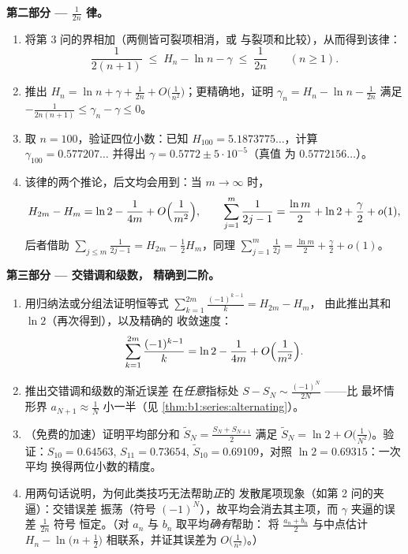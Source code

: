 \begin{problem}[{周末问题 --- $H_n = \ln n + \gamma +
\frac{1}{2n} + O(n^{-2})$，并将 $1 - \frac12 +
\frac13 - \dots$ 重排为 $\frac{\ln 2}{2}$}]
\medskip
\noindent\textbf{第二部分 --- $\frac{1}{2n}$ 律。}
\begin{enumerate}[resume]
  \item 将第 3 问的界相加（两侧皆可裂项相消，或
        与裂项和比较），从而得到该律：
        \[
        \frac{1}{2(n+1)} \;\leq\; H_n - \ln n - \gamma \;\leq\;
        \frac{1}{2n} \qquad (n \geq 1).
        \]
  \item 推出 $H_n = \ln n + \gamma + \frac{1}{2n} +
        O\bigl(\frac{1}{n^2}\bigr)$；更精确地，证明
        $\gamma_n = H_n - \ln n - \frac{1}{2n}$ 满足
        $-\frac{1}{2n(n+1)} \leq \gamma_n - \gamma \leq 0$。
  \item 取 $n = 100$，验证四位小数：已知 $H_{100} =
        5.1873775\dots$，计算 $\gamma_{100} = 0.577207\dots$
        并得出 $\gamma = 0.5772 \pm 5\cdot10^{-5}$（真值
        为 $0.5772156\dots$）。
  \item 该律的两个推论，后文均会用到：当 $m \to
        \infty$ 时，
        \[
        H_{2m} - H_m = \ln 2 - \frac{1}{4m} +
        O\Bigl(\frac{1}{m^2}\Bigr),
        \qquad
        \sum_{j=1}^{m} \frac{1}{2j-1} = \frac{\ln m}{2} + \ln 2
        + \frac\gamma2 + o(1) ,
        \]
        后者借助 $\sum_{j \leq m} \frac{1}{2j-1} = H_{2m}
        - \frac12 H_m$，同理 $\sum_{j=1}^{m}
        \frac{1}{2j} = \frac{\ln m}{2} + \frac\gamma2 + o(1)$。
\end{enumerate}

\medskip
\noindent\textbf{第三部分 --- 交错调和级数，
精确到二阶。}
\begin{enumerate}[resume]
  \item 用归纳法或分组法证明恒等式
        $\sum_{k=1}^{2m} \frac{(-1)^{k-1}}{k} = H_{2m} - H_m$，
        由此推出其和 $\ln 2$（再次得到），以及精确的
        收敛速度：
        \[
        \sum_{k=1}^{2m} \frac{(-1)^{k-1}}{k}
        = \ln 2 - \frac{1}{4m} + O\Bigl(\frac{1}{m^2}\Bigr) .
        \]
  \item 推出交错调和级数的渐近误差
        在\emph{任意}指标处 $S - S_N \sim
        \frac{(-1)^N}{2N}$ ——比
        最坏情形界 $a_{N+1} \approx \frac1N$ 小一半（见
        \cref{thm:b1:series:alternating}）。
  \item （免费的加速）证明平均部分和
        $\tilde S_N = \frac{S_N + S_{N+1}}{2}$ 满足 $\tilde
        S_N = \ln 2 + O\bigl(\frac{1}{N^2}\bigr)$。验证：$S_{10}
        = 0.64563$, $S_{11} = 0.73654$, $\tilde S_{10} =
        0.69109$，对照 $\ln 2 = 0.69315$：一次平均
        换得两位小数的精度。
  \item 用两句话说明，为何此类技巧无法帮助\emph{正}的
        发散尾项现象（如第 2 问的夹逼）：交错误差
        振荡（符号
        $(-1)^N$），故平均会消去其主项，而
        $\gamma$ 夹逼的误差 $\frac{1}{2n}$ 符号
        恒定。（对 $a_n$ 与 $b_n$ 取平均\emph{确有}帮助：
        将 $\frac{a_n + b_n}{2}$ 与中点估计
        $H_n - \ln\bigl(n + \frac12\bigr)$ 相联系，并证其误差为
        $O\bigl(\frac{1}{n^2}\bigr)$。）
\end{enumerate}


\end{problem}
